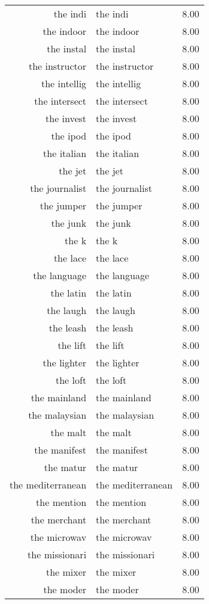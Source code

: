 \begin{table}[ht]
\begin{tabular}{rlr}
  the indi & the indi & 8.00 \\ 
  the indoor & the indoor & 8.00 \\ 
  the instal & the instal & 8.00 \\ 
  the instructor & the instructor & 8.00 \\ 
  the intellig & the intellig & 8.00 \\ 
  the intersect & the intersect & 8.00 \\ 
  the invest & the invest & 8.00 \\ 
  the ipod & the ipod & 8.00 \\ 
  the italian & the italian & 8.00 \\ 
  the jet & the jet & 8.00 \\ 
  the journalist & the journalist & 8.00 \\ 
  the jumper & the jumper & 8.00 \\ 
  the junk & the junk & 8.00 \\ 
  the k & the k & 8.00 \\ 
  the lace & the lace & 8.00 \\ 
  the language & the language & 8.00 \\ 
  the latin & the latin & 8.00 \\ 
  the laugh & the laugh & 8.00 \\ 
  the leash & the leash & 8.00 \\ 
  the lift & the lift & 8.00 \\ 
  the lighter & the lighter & 8.00 \\ 
  the loft & the loft & 8.00 \\ 
  the mainland & the mainland & 8.00 \\ 
  the malaysian & the malaysian & 8.00 \\ 
  the malt & the malt & 8.00 \\ 
  the manifest & the manifest & 8.00 \\ 
  the matur & the matur & 8.00 \\ 
  the mediterranean & the mediterranean & 8.00 \\ 
  the mention & the mention & 8.00 \\ 
  the merchant & the merchant & 8.00 \\ 
  the microwav & the microwav & 8.00 \\ 
  the missionari & the missionari & 8.00 \\ 
  the mixer & the mixer & 8.00 \\ 
  the moder & the moder & 8.00 \\ 

\end{tabular}
\end{table}
